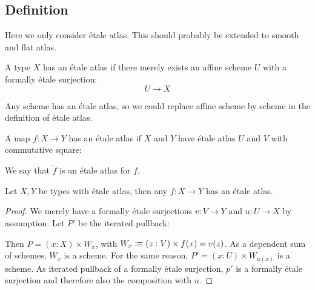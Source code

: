 \subsection{Definition}

\begin{remark}
Here we only consider étale atlas. This should probably be extended to smooth and flat atlas.
\end{remark}

\begin{definition}
A type $X$ has an étale atlas if there merely exists an affine scheme $U$ with a formally étale surjection:
\[U\to X\]
\end{definition}

\begin{remark}
Any scheme has an étale atlas, so we could replace affine scheme by scheme in the definition of étale atlas.
\end{remark}

\begin{definition}
A map $f:X\to Y$ has an étale atlas if $X$ and $Y$ have étale atlas $U$ and $V$ with commutative square:
  \begin{center}
  \end{center}
We say that $\widetilde{f}$ is an étale atlas for $f$.
\end{definition}

\begin{lemma}
  Let $X,Y$ be types with étale atlas, then any $f:X\to Y$ has an étale atlas.
\end{lemma}

\begin{proof}
  We merely have a formally étale surjections $v:V\to Y$ and $u:U\to X$ by assumption.
  Let $P'$ be the iterated pullback:
  \begin{center}
  \end{center}
  Then $P=(x:X)\times W_x$, with $W_x\vcentcolon\mspace{-1.2mu}\equiv (z:V)\times f(x)=v(z)$.
  As a dependent sum of schemes, $W_x$ is a scheme.
  For the same reason, $P'=(x:U)\times W_{u(x)}$ is a scheme.
  As iterated pullback of a formally étale surjection,
  $p'$ is a formally étale surjection and
  therefore also the composition with $u$.
\end{proof}

